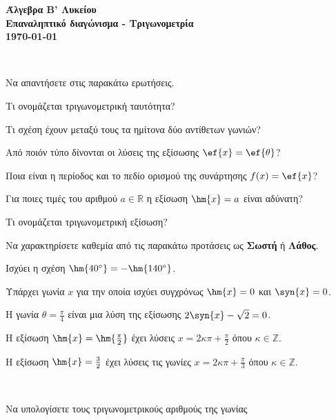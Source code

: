 \documentclass[11pt,a4paper]{article}
\newcommand{\kerkissans}[1]{{\fontfamily{maksf}\selectfont \textbf{#1}}}
\begin{document}
\begin{center}
{\LARGE \kerkissans{Άλγεβρα Β' Λυκείου}}\\
{\large \kerkissans{Επαναληπτικό διαγώνισμα - Τριγωνομετρία\\\today}}
\end{center}
\begin{thema}
\item\mbox{}\\\vspace{-5mm}
\begin{erwthma}
\item Να απαντήσετε στις παρακάτω ερωτήσεις.
\begin{alist}
\item Τι ονομάζεται τριγωνομετρική ταυτότητα?
\item Τι σχέση έχουν μεταξύ τους τα ημίτονα δύο αντίθετων γωνιών?
\item Από ποιόν τύπο δίνονται οι λύσεις της εξίσωσης $\ef{x}=\ef{\theta}$?
\item Ποια είναι η περίοδος και το πεδίο ορισμού της συνάρτησης $f(x)=\ef{x}$?
\item Για ποιες τιμές του αριθμού $a\in\mathbb{R}$ η εξίσωση $\hm{x}=a$ είναι αδύνατη?
\item Τι ονομάζεται τριγωνομετρική εξίσωση?
\end{alist}
\item Να χαρακτηρίσετε καθεμία από τις παρακάτω προτάσεις ως \textbf{Σωστή} ή \textbf{Λάθος}.
\begin{alist}
\item Ισχύει η σχέση $\hm{40\degree}=-\hm{140\degree}$.
\item Υπάρχει γωνία $x$ για την οποία ισχύει συγχρόνως $\hm{x}=0$ και $\syn{x}=0$.
\item Η γωνία $\theta=\frac{\pi}{4}$ είναι μια λύση της εξίσωσης $2\syn{x}-\sqrt{2}=0$.
\item Η εξίσωση $\hm{x}=\hm{\frac{\pi}{2}}$ έχει λύσεις $x=2\kappa \pi+\frac{\pi}{2}$ όπου $\kappa\in\mathbb{Z}$.
\item Η εξίσωση $\hm{x}=\frac{3}{2}$ έχει λύσεις τις γωνίες $x=2\kappa\pi+\frac{\pi}{3}$ όπου $\kappa\in\mathbb{Z}$.
\end{alist}
\end{erwthma}
\item\mbox{}\\
\vspace{-7mm}
\begin{erwthma}
\item Να υπολογίσετε τους τριγωνομετρικούς αριθμούς της γωνίας

\end{erwthma}
\end{thema}
\end{document}

